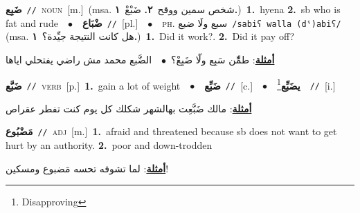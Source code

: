 \documentclass[10pt,a4paper,twoside]{article} %
\begin{document}
\begin{multicols}{2}
{\setlength\topsep{0pt}\textbf{\foreignlanguage{arabic}{ضَبِع}}\ {\color{gray}\texttt{//}\color{black}}\ \textsc{noun}\ [m.]\ \color{gray}(msa. \foreignlanguage{arabic}{شخص سمين ووقح}~\foreignlanguage{arabic}{\textbf{٢.}}  \foreignlanguage{arabic}{ضَبْعْ}~\foreignlanguage{arabic}{\textbf{١.}})\color{black}\ \textbf{1.}~hyena  \textbf{2.}~sb who is fat and rude\ \ $\bullet$\ \ \setlength\topsep{0pt}\textbf{\foreignlanguage{arabic}{ضْبَاع}}\ {\color{gray}\texttt{//}\color{black}}\ [pl.]\ \ $\bullet$\ \ \textsc{ph.} \color{gray} \foreignlanguage{arabic}{سبع ولَا ضبع}\color{black}\ {\color{gray}\texttt{/{\sffamily sabiʕ walla (dˤ)abiʕ}/}\color{black}}\ \color{gray} (msa. \foreignlanguage{arabic}{هل كانت النتيجة جيِّدة؟}~\foreignlanguage{arabic}{\textbf{١.}})\color{black}\ \textbf{1.}~Did it work?.  \textbf{2.}~Did it pay off?\  \begin{flushright}\color{gray}\foreignlanguage{arabic}{\textbf{\underline{\foreignlanguage{arabic}{أمثلة}}}: طمِّّن سَبِع ولّا ضَبِعْ؟\ $\bullet$\ \  الضَّبع محمد مش راضي يفتحلي اياها}\end{flushright}\color{black}} \vspace{2mm}

{\setlength\topsep{0pt}\textbf{\foreignlanguage{arabic}{ضَبَّع}}\ {\color{gray}\texttt{//}\color{black}}\ \textsc{verb}\ [p.]\ \textbf{1.}~gain a lot of weight\ \ $\bullet$\ \ \setlength\topsep{0pt}\textbf{\foreignlanguage{arabic}{ضَبِّع}}\ {\color{gray}\texttt{//}\color{black}}\ [c.]\ \ $\bullet$\ \ \setlength\topsep{0pt}\textbf{\foreignlanguage{arabic}{يضَبِّع}}\footnote{Disapproving}\ \ {\color{gray}\texttt{//}\color{black}}\ [i.]\  \begin{flushright}\color{gray}\foreignlanguage{arabic}{\textbf{\underline{\foreignlanguage{arabic}{أمثلة}}}: مالك ضَبَّعِت بهالشهر شكلك كل يوم كنت تفطر عقراص}\end{flushright}\color{black}} \vspace{2mm}

{\setlength\topsep{0pt}\textbf{\foreignlanguage{arabic}{مَضْبُوع}}\ {\color{gray}\texttt{//}\color{black}}\ \textsc{adj}\ [m.]\ \textbf{1.}~afraid and threatened because sb does not want to get hurt by an authority.  \textbf{2.}~poor and down-trodden\  \begin{flushright}\color{gray}\foreignlanguage{arabic}{\textbf{\underline{\foreignlanguage{arabic}{أمثلة}}}: لما تشوفه تحسه مَضبوع ومسكين!}\end{flushright}\color{black}} \vspace{2mm}


\end{multicols}
\end{document}
